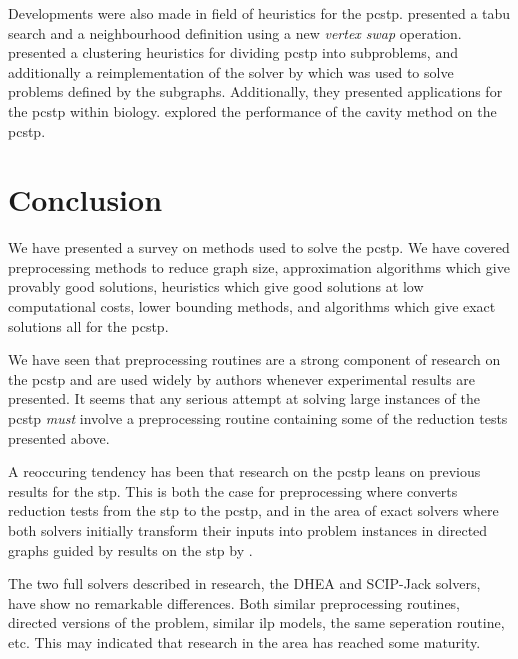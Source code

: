   Developments were also made in field of heuristics for the \gls{pcstp}. \citet{fu2014knowledge} presented a tabu search and a neighbourhood definition
  using a new \textit{vertex swap} operation.
  \citet{akhmedov2016divide} presented a clustering heuristics for dividing \gls{pcstp} into subproblems,
  and additionally a
  reimplementation of the solver by \citet{ljubic2005solving} which was used to solve problems defined by the subgraphs. Additionally, they presented
  applications for the \gls{pcstp} within biology.
  \citet{biazzo2012performance} explored the performance of the cavity method on the \gls{pcstp}.

\clearpage


\clearpage








\section{Conclusion}
We have presented a survey on methods used to solve the \acrlong{pcstp}. We have covered
preprocessing methods to reduce graph size, approximation algorithms which give provably
good solutions, heuristics which give good solutions at low computational costs, lower
bounding methods, and algorithms which give exact solutions all for the \gls{pcstp}.

We have seen that preprocessing routines are a strong component of
research on the \gls{pcstp} and are
used widely by authors whenever experimental results are presented. It seems that
any serious attempt at solving large instances of the \gls{pcstp} \textit{must} involve a
preprocessing routine containing some of the reduction tests presented above.

A reoccuring tendency has been that research on the \gls{pcstp} leans on
previous results for the \gls{stp}. This is both the case for preprocessing
where \citet{uchoa2006reduction} converts reduction tests from the \gls{stp}
to the \gls{pcstp}, and in the area of exact solvers where both solvers
initially transform their inputs into problem instances in directed graphs
guided by results on the \gls{stp} by \citet{chopra1994steiner}.

The two full solvers described in research, the DHEA and SCIP-Jack solvers, have show no
remarkable differences. Both similar preprocessing routines, directed versions of the problem,
similar \gls{ilp} models, the same seperation routine, etc. This may indicated that research
in the area has reached some maturity.



